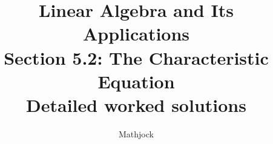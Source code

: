 
\title{\textbf{Linear Algebra and Its Applications}\\[0.3em]Section 5.2: The Characteristic Equation\\[0.3em]\large Detailed worked solutions}
\author{Mathjock}
\date{}

\maketitle
\bookinfo
\tableofcontents
\clearpage
\renewcommand{\thesection}{5.\arabic{section}}
\renewcommand{\theHsection}{5.\arabic{section}}
\setcounter{section}{1}


